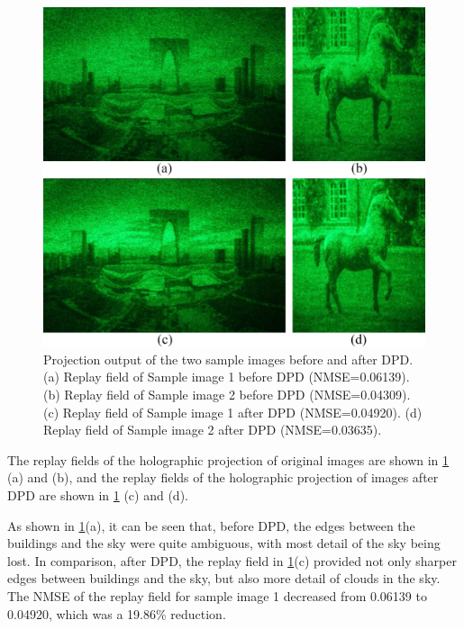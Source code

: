 \begin{figure}[H]
    \centering
    \includegraphics[width=\textwidth]{Projection_output_of_the_two_sample_images_before_and_after_DPD.jpg}
    \caption{Projection output of the two sample images before and after DPD. (a) Replay field of Sample image 1 before DPD (NMSE=0.06139). (b) Replay field of Sample image 2 before DPD (NMSE=0.04309). (c) Replay field of Sample image 1 after DPD (NMSE=0.04920). (d) Replay field of Sample image 2 after DPD (NMSE=0.03635).}
    \label{fig:Projection output of the two sample images before and after DPD}
\end{figure}
\vspace{3mm}

The replay fields of the holographic projection of original images are shown in \cref{fig:Projection output of the two sample images before and after DPD} (a) and (b), and the replay fields of the holographic projection of images after DPD are shown in \cref{fig:Projection output of the two sample images before and after DPD} (c) and (d).

As shown in \cref{fig:Projection output of the two sample images before and after DPD}(a), it can be seen that, before DPD, the edges between the buildings and the sky were quite ambiguous, with most detail of the sky being lost. In comparison, after DPD, the replay field in \cref{fig:Projection output of the two sample images before and after DPD}(c) provided not only sharper edges between buildings and the sky, but also more detail of clouds in the sky. The NMSE of the replay field for sample image 1 decreased from 0.06139 to 0.04920, which was a 19.86\% reduction.

